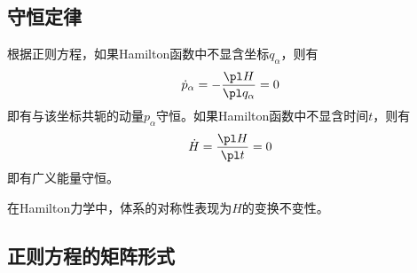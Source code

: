\subsection{守恒定律}

根据正则方程，如果Hamilton函数中不显含坐标$q_\alpha$，则有
\begin{equation*}
	\dot{p}_\alpha = -\frac{\pl H}{\pl q_\alpha} = 0
\end{equation*}
即有与该坐标共轭的动量$p_\alpha$守恒。如果Hamilton函数中不显含时间$t$，则有
\begin{equation*}
	\dot{H} = \frac{\pl H}{\pl t} = 0
\end{equation*}
即有广义能量守恒。

在Hamilton力学中，体系的对称性表现为$H$的变换不变性。

\subsection{正则方程的矩阵形式}

